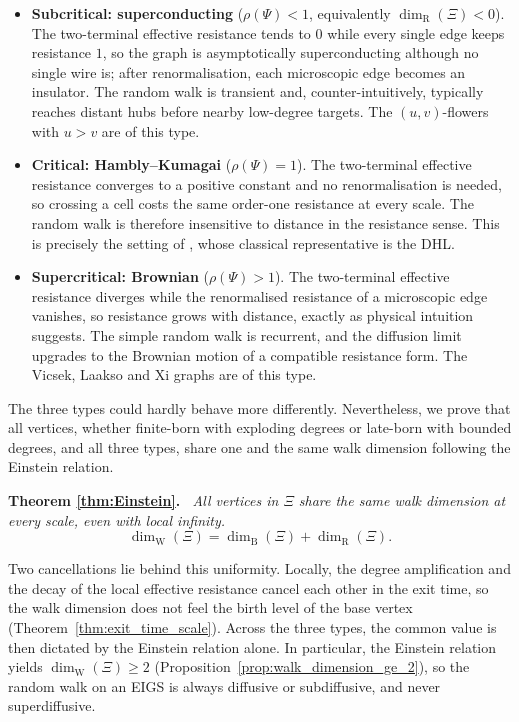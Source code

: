 \documentclass{article}
\newenvironment{restated}[1]{%
  \par\noindent\textbf{Theorem #1.}\itshape\ }%
  {\par}
\theoremstyle{plain}
\theoremstyle{definition}
\newcommand{\dimbox}{\dim_\mathrm{B}}
\newcommand{\dimwalk}{\dim_\mathrm{W}}
\newcommand{\dimresis}{\dim_\mathrm{R}}
\begin{document}
\begin{itemize}
\item \textbf{Subcritical: superconducting} ($\rho(\Psi)<1$, equivalently $\dimresis(\Xi)<0$).
The two-terminal effective resistance tends to $0$ while every single edge keeps resistance $1$, so the graph is asymptotically superconducting although no single wire is; after renormalisation, each microscopic edge becomes an insulator.
The random walk is transient and, counter-intuitively, typically reaches distant hubs before nearby low-degree targets.
The $(u,v)$-flowers with $u>v$ are of this type.
\item \textbf{Critical: Hambly--Kumagai} ($\rho(\Psi)=1$).
The two-terminal effective resistance converges to a positive constant and no renormalisation is needed, so crossing a cell costs the same order-one resistance at every scale.
The random walk is therefore insensitive to distance in the resistance sense.
This is precisely the setting of \cite{hambly2010diffusion}, whose classical representative is the DHL.
\item \textbf{Supercritical: Brownian} ($\rho(\Psi)>1$).
The two-terminal effective resistance diverges while the renormalised resistance of a microscopic edge vanishes, so resistance grows with distance, exactly as physical intuition suggests.
The simple random walk is recurrent, and the diffusion limit upgrades to the Brownian motion of a compatible resistance form.
The Vicsek, Laakso and Xi graphs are of this type.
\end{itemize}

The three types could hardly behave more differently.
Nevertheless, we prove that all vertices, whether finite-born with exploding degrees or late-born with bounded degrees, and all three types, share one and the same walk dimension following the Einstein relation.

\begin{restated}{\ref{thm:Einstein}}
All vertices in $\Xi$ share the same walk dimension at every scale, even with local infinity.
\[
\dimwalk(\Xi)=\dimbox(\Xi)+\dimresis(\Xi).
\]
\end{restated}

Two cancellations lie behind this uniformity.
Locally, the degree amplification and the decay of the local effective resistance cancel each other in the exit time, so the walk dimension does not feel the birth level of the base vertex (Theorem~\ref{thm:exit_time_scale}).
Across the three types, the common value is then dictated by the Einstein relation alone.
In particular, the Einstein relation yields $\dimwalk(\Xi)\ge 2$ (Proposition~\ref{prop:walk_dimension_ge_2}), so the random walk on an EIGS is always diffusive or subdiffusive, and never superdiffusive.
\end{document}
